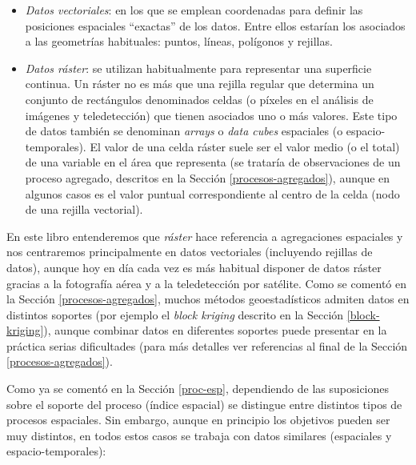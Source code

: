\documentclass[
]{book}
\theoremstyle{break}
\theoremstyle{definition}
\theoremstyle{definition}
\theoremstyle{definition}
\theoremstyle{definition}
\theoremstyle{remark}
\begin{document}
\begin{itemize}
\item
  \emph{Datos vectoriales}: en los que se emplean coordenadas para definir las posiciones espaciales ``exactas'' de los datos. Entre ellos estarían los asociados a las geometrías habituales: puntos, líneas, polígonos y rejillas.
\item
  \emph{Datos ráster}: se utilizan habitualmente para representar una superficie continua. Un ráster no es más que una rejilla regular que determina un conjunto de rectángulos denominados celdas (o píxeles en el análisis de imágenes y teledetección) que tienen asociados uno o más valores. Este tipo de datos también se denominan \emph{arrays} o \emph{data cubes} espaciales (o espacio-temporales). El valor de una celda ráster suele ser el valor medio (o el total) de una variable en el área que representa (se trataría de observaciones de un proceso agregado, descritos en la Sección \ref{procesos-agregados}), aunque en algunos casos es el valor puntual correspondiente al centro de la celda (nodo de una rejilla vectorial).
\end{itemize}

En este libro entenderemos que \emph{ráster} hace referencia a agregaciones espaciales y nos centraremos principalmente en datos vectoriales (incluyendo rejillas de datos), aunque hoy en día cada vez es más habitual disponer de datos ráster gracias a la fotografía aérea y a la teledetección por satélite.
Como se comentó en la Sección \ref{procesos-agregados}, muchos métodos geoestadísticos admiten datos en distintos soportes (por ejemplo el \emph{block kriging} descrito en la Sección \ref{block-kriging}), aunque combinar datos en diferentes soportes puede presentar en la práctica serias dificultades (para más detalles ver referencias al final de la Sección \ref{procesos-agregados}).

Como ya se comentó en la Sección \ref{proc-esp}, dependiendo de las suposiciones sobre el soporte del proceso (índice espacial) se distingue entre distintos tipos de procesos espaciales.
Sin embargo, aunque en principio los objetivos pueden ser muy distintos, en todos estos casos se trabaja con datos similares (espaciales y espacio-temporales):
\end{document}
